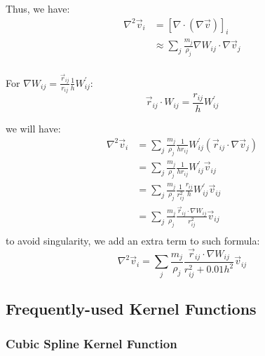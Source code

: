 Thus, we have:
\begin{equation}
    \begin{aligned}
        \nabla^2\vec{v}_i &= [\nabla\cdot (\nabla\vec{v})]_i\\
        &\approx \sum_j \frac{m_j}{\rho_j} \nabla W_{ij}
        \cdot \nabla\vec{v}_j\\
    \end{aligned}
\end{equation}

For $\nabla W_{ij} = \frac{\vec{r}_{ij}}{r_{ij}}\frac{1}{h}W^\prime_{ij}$:
\begin{equation}
    \vec{r}_{ij}\cdot W_{ij} = \frac{r_{ij}}{h}W^\prime_{ij}
\end{equation}

we will have:
\begin{equation}
    \begin{aligned}
        \nabla^2\vec{v}_i &= 
    \sum_j \frac{m_j}{\rho_j} \frac{1}{h r_{ij}}W^\prime_{ij}
    (\vec{r}_{ij} \cdot \nabla\vec{v}_j)\\
    &=
    \sum_j \frac{m_j}{\rho_j} \frac{1}{h r_{ij}}W^\prime_{ij}\vec{v}_{ij}\\
    &=
    \sum_j \frac{m_j}{\rho_j} \frac{1}{r_{ij}^2} \frac{r_{ij}}{h}W^\prime_{ij}\vec{v}_{ij}\\
    &=
    \sum_j \frac{m_j}{\rho_j} \frac{\vec{r}_{ij}\cdot \nabla W_{ij}}{r_{ij}^2} \vec{v}_{ij}\\
    \end{aligned}
\end{equation}
to avoid singularity, 
we add an extra term to such formula:
\begin{equation}
    \nabla^2\vec{v}_i = 
    \sum_j \frac{m_j}{\rho_j} \frac{\vec{r}_{ij}\cdot \nabla W_{ij}}{r_{ij}^2+0.01h^2} \vec{v}_{ij}
\end{equation}

\subsection{Frequently-used Kernel Functions}

\subsubsection{Cubic Spline Kernel Function}

